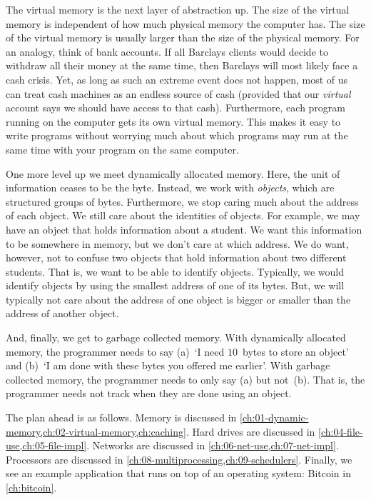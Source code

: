 The virtual memory is the next layer of abstraction up.
The size of the virtual memory is independent of how much physical memory the computer has.
The size of the virtual memory is usually larger than the size of the physical memory.
For an analogy, think of bank accounts.
If all Barclays clients would decide to withdraw all their money at the same time, then Barclays will most likely face a cash crisis.
Yet, as long as such an extreme event does not happen, most of us can treat cash machines as an endless source of cash (provided that our \emph{virtual} account says we should have access to that cash).
Furthermore, each program running on the computer gets its own virtual memory.
This makes it easy to write programs without worrying much about which programs may run at the same time with your program on the same computer.

One more level up we meet dynamically allocated memory.
Here, the unit of information ceases to be the byte.
Instead, we work with \emph{objects}, which are structured groups of bytes.
Furthermore, we stop caring much about the address of each object.
We still care about the identities of objects.
For example, we may have an object that holds information about a student.
We want this information to be somewhere in memory, but we don't care at which address.
We do want, however, not to confuse two objects that hold information about two different students.
That is, we want to be able to identify objects.
Typically, we would identify objects by using the smallest address of one of its bytes.
But, we will typically not care about the address of one object is bigger or smaller than the address of another object.

And, finally, we get to garbage collected memory.
With dynamically allocated memory, the programmer needs to say (a)~`I need $10$~bytes to store an object' and (b)~`I am done with these bytes you offered me earlier'.
With garbage collected memory, the programmer needs to only say (a) but not~(b).
That is, the programmer needs not track when they are done using an object.

\medskip

The plan ahead is as follows.
Memory is discussed in \cref{ch:01-dynamic-memory,ch:02-virtual-memory,ch:caching}.
Hard drives are discussed in \cref{ch:04-file-use,ch:05-file-impl}.
Networks are discussed in \cref{ch:06-net-use,ch:07-net-impl}.
Processors are discussed in \cref{ch:08-multiprocessing,ch:09-schedulers}.
Finally, we see an example application that runs on top of an operating system: Bitcoin in \cref{ch:bitcoin}.

